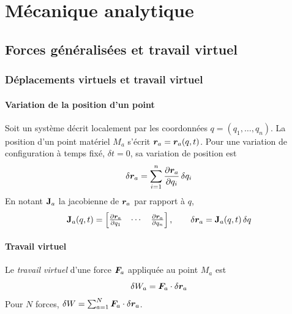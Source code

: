 
\section{Mécanique analytique}

\subsection{Forces généralisées et travail virtuel}

\subsubsection{Déplacements virtuels et travail virtuel}

\paragraph{Variation de la position d'un point}

Soit un système décrit localement par les coordonnées
$q = (q_1,\dots,q_n)$. La position d'un point matériel $M_a$ s'écrit
$\bm{r}_a = \bm{r}_a(q,t)$. Pour une variation de configuration à
temps fixé, $\delta t = 0$, sa variation de position est
\[
    \delta\bm{r}_a = \sum_{i=1}^{n}\frac{\partial \bm{r}_a}{\partial q_i}\,\delta q_i
\]
En notant $\mathbf{J}_a$ la jacobienne de $\bm{r}_a$ par rapport à $q$,
\[
    \mathbf{J}_a(q,t) = \begin{bmatrix}
        \frac{\partial \bm{r}_a}{\partial q_1} & \cdots & \frac{\partial \bm{r}_a}{\partial q_n}
    \end{bmatrix},
    \qquad
    \delta\bm{r}_a = \mathbf{J}_a(q,t)\,\delta q
\]

\paragraph{Travail virtuel}

\begin{definition}
    Le \emph{travail virtuel} d'une force $\bm{F}_a$ appliquée au
    point $M_a$ est
    \[
        \delta W_a = \bm{F}_a\cdot\delta\bm{r}_a
    \]
    Pour $N$ forces, $\delta W = \sum_{a=1}^{N}\bm{F}_a\cdot
    \delta\bm{r}_a$.
\end{definition}

